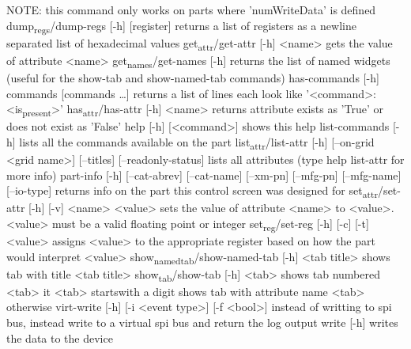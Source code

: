 \documentclass[11pt]{article}
\begin{document}
  NOTE: this command only works on parts where 'numWriteData' is defined
dump\textsubscript{regs}/dump-regs [-h] [register]
  returns a list of registers as a newline separated list of hexadecimal values
get\textsubscript{attr}/get-attr [-h] <name>
  gets the value of attribute <name>
get\textsubscript{names}/get-names [-h]
  returns the list of named widgets (useful for the show-tab and show-named-tab commands)
has-commands [-h] commands [commands \ldots{}]
  returns a list of lines each look like '<command>: <is\textsubscript{present}>'
has\textsubscript{attr}/has-attr [-h] <name>
  returns attribute exists as 'True' or does not exist as 'False'
help [-h] [<command>]
  shows this help
list-commands [-h]
  lists all the commands available on the part
list\textsubscript{attr}/list-attr [-h] [--on-grid <grid name>] [--titles] [--readonly-status]
  lists all attributes (type help list-attr for more info)
part-info  [-h] [--cat-abrev] [--cat-name] [--xm-pn] [--mfg-pn] [--mfg-name]
	[--io-type]
  returns info on the part this control screen was designed for
set\textsubscript{attr}/set-attr [-h] [-v] <name> <value>
  sets the value of attribute <name> to <value>.
  <value> must be a valid floating point or integer
set\textsubscript{reg}/set-reg [-h] [-c] [-t] <value>
  assigns <value> to the appropriate register based on how the part would interpret <value>
show\textsubscript{named}\textsubscript{tab}/show-named-tab [-h] <tab title>
  shows tab with title <tab title>
show\textsubscript{tab}/show-tab [-h] <tab>
  shows tab numbered <tab> it <tab> startswith a digit
  shows tab with attribute name <tab> otherwise
virt-write [-h] [-i <event type>] [-f <bool>]
  instead of writting to spi bus, instead write to a virtual spi bus
  and return the log output
write [-h]
  writes the data to the device
\end{document}

